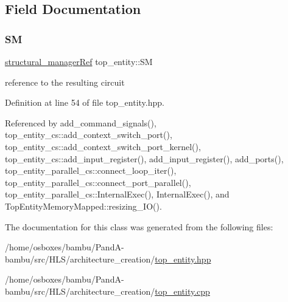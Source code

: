 \subsection{Field Documentation}
\mbox{\label{classtop__entity_acc7310a6d8736a54e75462e211d2fc32}} 
\subsubsection{\texorpdfstring{SM}{SM}}
{\footnotesize\ttfamily \hyperlink{structural__manager_8hpp_ab3136f0e785d8535f8d252a7b53db5b5}{structural\+\_\+manager\+Ref} top\+\_\+entity\+::\+SM\hspace{0.3cm}{\ttfamily [protected]}}



reference to the resulting circuit 



Definition at line 54 of file top\+\_\+entity.\+hpp.



Referenced by add\+\_\+command\+\_\+signals(), top\+\_\+entity\+\_\+cs\+::add\+\_\+context\+\_\+switch\+\_\+port(), top\+\_\+entity\+\_\+cs\+::add\+\_\+context\+\_\+switch\+\_\+port\+\_\+kernel(), top\+\_\+entity\+\_\+cs\+::add\+\_\+input\+\_\+register(), add\+\_\+input\+\_\+register(), add\+\_\+ports(), top\+\_\+entity\+\_\+parallel\+\_\+cs\+::connect\+\_\+loop\+\_\+iter(), top\+\_\+entity\+\_\+parallel\+\_\+cs\+::connect\+\_\+port\+\_\+parallel(), top\+\_\+entity\+\_\+parallel\+\_\+cs\+::\+Internal\+Exec(), Internal\+Exec(), and Top\+Entity\+Memory\+Mapped\+::resizing\+\_\+\+I\+O().



The documentation for this class was generated from the following files\+:\begin{DoxyCompactItemize}
\item 
/home/osboxes/bambu/\+Pand\+A-\/bambu/src/\+H\+L\+S/architecture\+\_\+creation/\hyperlink{top__entity_8hpp}{top\+\_\+entity.\+hpp}\item 
/home/osboxes/bambu/\+Pand\+A-\/bambu/src/\+H\+L\+S/architecture\+\_\+creation/\hyperlink{top__entity_8cpp}{top\+\_\+entity.\+cpp}\end{DoxyCompactItemize}
